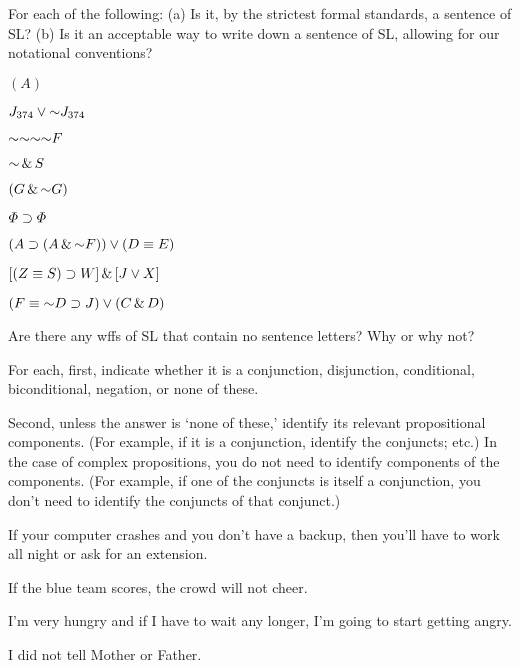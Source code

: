 {\solutions
\problempart
\label{pr.wiffSL}
For each of the following: (a) Is it, by the strictest formal standards, a sentence of SL? (b) Is it an acceptable way to write down a sentence of SL, allowing for our notational conventions?
\begin{earg}
\item $(A)$
\item $J_{374} \eor \enot J_{374}$
\item $\enot \enot \enot \enot F$
\item $\enot \eand S$
\item $(G \eand \enot G)$
\item $\varPhi{} \supset \varPhi{}$
\item $(A \eif (A \eand \enot F)) \eor (D \eiff E)$
\item $[(Z \equiv S) \supset W] \,\&\, [J \vee X]$
\item $(F \eiff \enot D \eif J) \eor (C \eand D)$
\end{earg}



\problempart
\begin{earg}
\item Are there any wffs of SL that contain no sentence letters? Why or why not?
\end{earg}

\problempart
\label{HW2.B}
For each, first, indicate whether it is a conjunction, disjunction, conditional, biconditional, negation, or none of these.

Second, unless the answer is ‘none of these,’ identify its relevant propositional components. (For example, if it is a conjunction, identify the conjuncts; etc.) In the case of complex propositions, you do not need to identify components of the components. (For example, if one of the conjuncts is itself a conjunction, you don’t need to identify the conjuncts of that conjunct.)

	\begin{earg}
		\item If your computer crashes and you don’t have a backup, then you’ll have to work all night or ask for an extension.
		\item If the blue team scores, the crowd will not cheer.
		\item I’m very hungry and if I have to wait any longer, I’m going to start getting angry.
		\item I did not tell Mother or Father.
	\end{earg}
	
}
